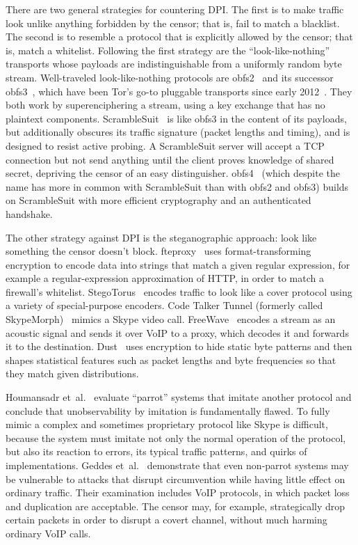 \documentclass[conference]{IEEEtran}
\begin{document}
There are two general strategies for countering DPI.
The first is to make traffic look unlike
anything forbidden by the censor; that is, fail to match a blacklist. The second is
to resemble a protocol that is explicitly allowed by the censor; that is, match a whitelist.
Following the first strategy are the ``look-like-nothing'' transports whose
payloads are indistinguishable from a uniformly random byte stream.
Well-traveled look-like-nothing
protocols are obfs2~\cite{obfs2} and its successor obfs3~\cite{obfs3},
which have been Tor's go-to pluggable transports since early 2012~\cite{obfsproxy-arms-race}.
They both work by superenciphering a stream, using a key exchange that has no plaintext components.
ScrambleSuit~\cite{scramblesuit} is like obfs3 in the
content of its payloads, but additionally obscures its traffic signature
(packet lengths and timing), and is designed to resist active probing.
A ScrambleSuit server will accept a TCP connection but not send anything
until the client proves knowledge of shared secret, depriving the censor
of an easy distinguisher.
obfs4~\cite{obfs4}
(which despite the name has more in common with ScrambleSuit than with obfs2 and obfs3)
builds on ScrambleSuit with more efficient cryptography and an authenticated handshake.

The other strategy against DPI is the steganographic approach: look like
something the censor doesn't block.
fteproxy~\cite{fte} uses format-transforming encryption to encode data into strings
that match a given regular expression,
for example a regular-expression approximation of HTTP,
in order to match a firewall's whitelist.
StegoTorus~\cite{stegotorus}
encodes traffic to look like a cover protocol
using a variety of special-purpose encoders.
Code Talker
Tunnel (formerly called SkypeMorph)~\cite{skypemorph} mimics a Skype video call.
FreeWave~\cite{freewave} encodes a stream as an acoustic signal
and sends it over VoIP to a proxy, which decodes it and forwards it to the destination.
Dust~\cite{dust} uses encryption to hide static byte patterns and then
shapes statistical features such as packet lengths and byte frequencies so that they
match given distributions.

Houmansadr et~al.~\cite{parrot} evaluate ``parrot'' systems that imitate another protocol
and conclude that unobservability by imitation is fundamentally flawed.
To fully mimic a complex and sometimes proprietary protocol like Skype
is difficult,
because the system must imitate not only the normal operation of the protocol,
but also its reaction to errors,
its typical traffic patterns, and quirks of implementations.
Geddes et~al.~\cite{acks}
demonstrate that even non-parrot systems may be vulnerable to
attacks that disrupt circumvention while having little effect
on ordinary traffic.
Their examination includes VoIP protocols,
in which packet loss and duplication are acceptable.
The censor may, for example, strategically drop certain packets
in order to disrupt a covert channel, without much harming ordinary VoIP calls.
\end{document}
